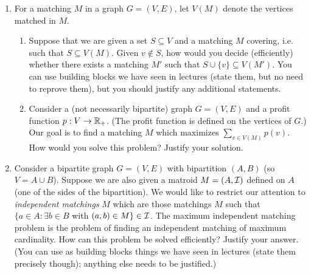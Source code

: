 \documentclass[12pt]{article}
\begin{document}
\begin{enumerate}
\item For a matching $M$ in a graph $G=(V,E)$, let $V(M)$ denote the vertices matched in $M$. 
\begin{enumerate}
\item
Suppose that we are given a set $S\subseteq V$ and a matching $M$ covering, i.e. such that $S\subseteq V(M)$. Given $v\notin S$, how would you decide (efficiently) 	whether there exists a matching $M'$ such that $S\cup\{v\} \subseteq V(M')$. You can use building blocks we have seen in lectures (state them, but no need to reprove them), but you should justify any additional statements. 


\item

 Consider a (not necessarily bipartite) graph $G=(V,E)$ and a
  profit function $p: V\rightarrow {\mathbb R}_+$. (The profit function is
  defined on the vertices of $G$.) Our goal is to find a matching $M$
  which maximizes $\sum_{v\in V(M)} p(v)$. How would you solve this problem? Justify
  your solution.
  
\end{enumerate}


\item Consider a bipartite graph $G=(V,E)$ with bipartition $(A,B)$
  (so $V=A \cup B$). Suppose we are also given a matroid $M=(A,{\cal
    I})$ defined on $A$ (one of the sides of the bipartition). We would
  like to restrict our attention to {\it independent matchings} $M$
  which are those matchings $M$ such that $\{a\in A: \exists b\in B$
  with $(a,b)\in M\}\in {\cal I}$. The maximum independent matching
  problem is the problem of finding an independent matching of maximum
  cardinality. How can this problem be solved efficiently?  Justify your
  answer. (You can use as building blocks things we have seen in
  lectures (state them precisely though); anything else needs to be justified.)




\end{enumerate}

\end{document}
